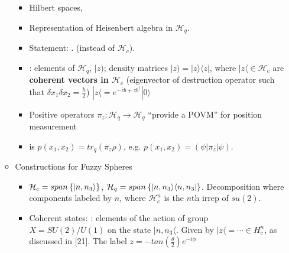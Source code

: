 \documentclass{article}
\begin{document}
\begin{itemize}
\begin{itemize}
\begin{itemize}
            \item Hilbert spaces, 
            
            \item Representation of Heisenbert algebra in $\mathcal H_q$. 
            
            \item Statement: . (instead of $\mathcal H_c$).
            
            \item {}: elements of $\mathcal H_q$, $|z)$; density matrices $|z) = |z\rangle \langle z|$, where $|z\langle \in \mathcal H_c$ are \textbf{coherent vectors in $\mathcal H_c$} (eigenvector of destruction operator such that $\delta x_1 \delta x_2 = \frac{\hbar}{2}$) $|z\langle = e^{-\overline{z} b + z b^\dagger}|0\rangle$
            
            \item Positive operators $\pi_z: \mathcal H_q \to \mathcal H_q$ ``provide a POVM'' for position measurement
            
            \item {} is $p(x_1, x_2) = tr_q(\pi_z \rho)$, e.g. $p(x_1, x_2) = (\psi|\pi_z|\psi)$.
                
            \end{itemize}
        
        \item Constructions for Fuzzy Spheres
        
            \begin{itemize}
                
            \item $\mathcal H_c = span\left\{ |n, n_3\rangle \right\}$, $\mathcal H_q = span\left\{ |n, n_3\rangle \langle n, n_3| \right\}$. Decomposition where components labeled by $n$, where $\mathcal H_c^n$ is the $n$th irrep of $su(2)$.
            
            \item Coherent states: : elements of the action of group $X = SU(2)/U(1)$ on the state $|n, n_3\langle$. Given by $|z\langle = \cdots \in H^n_c$, as discussed in [21]. The label $z = -tan(\frac{\theta}{2})e^{-i \phi}$
                

\end{itemize}
\end{itemize}
\end{itemize}
\end{document}
